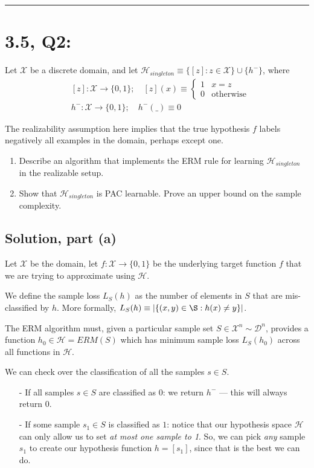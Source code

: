 \documentclass[11pt]{article}
\newcommand{\D}{\ensuremath{\mathcal{D}}}
\renewcommand{\H}{\ensuremath{\mathcal{H}}}
\newcommand{\X}{\ensuremath{\mathcal{X}}}
\begin{document}
\rule{\textwidth}{1pt}
\section*{3.5, Q2:} 
Let $\X$ be a discrete domain, and let 
$\H_{singleton} \equiv \{ [z] : z \in \X \} \cup \{h^− \}$, where
\begin{align*}
&[z]: \X \rightarrow \{0,1\};  \quad [z](x) \equiv \begin{cases} 1 & x = z \\ 0 & \text{otherwise} \end{cases}\\
&h^−: \X \rightarrow \{0, 1\}; \quad h^-(\_) \equiv 0
\end{align*}

The realizability assumption here implies that the true hypothesis $f$ labels
negatively all examples in the domain, perhaps except one.

\begin{enumerate}
    \item Describe an algorithm that implements the ERM rule for learning
        $\H_{singleton}$ in the realizable setup.
    \item Show that $\H_{singleton}$ is PAC learnable. Prove an upper
        bound on the sample complexity.
\end{enumerate}

\subsection*{Solution, part (a)}
Let $\X$ be the domain, let $f: \X \rightarrow \{0, 1\}$ be the underlying
target function $f$ that we are trying to approximate using $\H$.

We define the sample loss $L_S(h)$ as the number of elements in $S$
that are mis-classified by $h$. More formally,
$L_S(h) \equiv |\{ (x, y) \in \S : h(x) \neq  y \}|$.

The ERM algorithm must, given a particular sample set $S \in \X^n \sim \D^n$,
provides a function $h_0 \in \H = ERM(S)$ which has minimum sample loss
$L_S(h_0)$ across all functions in $\H$.

We can check over the classification of all the samples $s \in S$.
\begin{itemize}
    \item[-] If all samples $s \in S $ are classified as $0$:
        we return $h^-$ --- this will always return $0$.
    \item[-] If some sample $s_1 \in S$ is classified as $1$: notice that
        our hypothesis space $\H$ can only allow us to set
        \emph{at most one sample to 1}. So, we can pick \emph{any} sample
        $s_1$ to create our hypothesis function $h = [s_1]$, since that
        is the best we can do.
\end{itemize}
\end{document}
